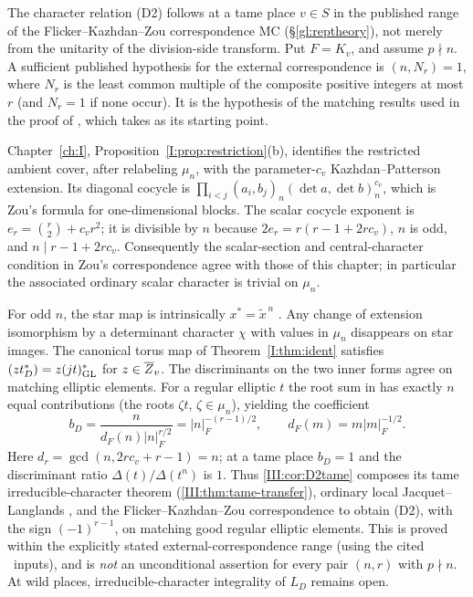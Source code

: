 \begin{remark}\label{I:rem:D2tame}
The character relation (D2) follows at a tame place $v\in S$ in the
published range of the Flicker--Kazhdan--Zou
correspondence $\mathrm{MC}$ (\S\ref{gl:reptheory}), not merely from the unitarity of the division-side
transform.  Put $F=K_v$, and assume $p\nmid n$.
A sufficient published hypothesis for the external correspondence
is $(n,N_r)=1$, where $N_r$ is the least common multiple of the
composite positive integers at most $r$ (and $N_r=1$ if none occur).
It is the hypothesis of the matching results
\cite[\S12, Corollary; \S13, Theorem]{FK86} used in the proof of
\cite[\S26, Theorem]{FK86}, which \cite[Proposition~3.6 and
Definition~3.7]{Zo23} takes as its starting point.

Chapter~\ref{ch:I}, Proposition~\ref{I:prop:restriction}(b), identifies the
restricted ambient cover, after relabeling $\mu_n$, with the
parameter-$c_v$ Kazhdan--Patterson extension.  Its diagonal cocycle
is $\prod_{i<j}(a_i,b_j)_n(\det a,\det b)_n^{c_v}$,
which is Zou's formula \cite[(2.1)]{Zo23} for one-dimensional blocks.
The scalar cocycle exponent is
$e_r=\binom r2+c_vr^2$; it is divisible by $n$ because
$2e_r=r(r-1+2rc_v)$, $n$ is odd, and
$n\mid r-1+2rc_v$.  Consequently the scalar-section and
central-character condition in Zou's correspondence agree with
those of this chapter; in particular the associated ordinary scalar
character is trivial on $\mu_n$.

For odd $n$, the star map is intrinsically
$x^*=\tilde x^{\,n}$ \cite[\S4]{FK86}.  Any change of extension
isomorphism by a determinant character $\chi$ with values in
$\mu_n$ disappears on star images.  The canonical torus map of
Theorem~\ref{I:thm:ident} satisfies
$\relax(z t_D^*)=z(jt)_{\mathrm{GL}}^*$ for $z\in\overline{Z}_v$.
The discriminants on the two inner forms agree on matching
elliptic elements.  For a regular elliptic $t$ the root sum in
\cite[(3.2)]{Zo23} has exactly $n$ equal contributions (the roots
$\zeta t$, $\zeta\in\mu_n$), yielding the coefficient
\[
 b_D=\frac{n}{d_F(n)|n|_F^{r/2}}
     =|n|_F^{-(r-1)/2},\qquad
 d_F(m)=m|m|_F^{-1/2}.
\]
Here $d_r=\gcd(n,2rc_v+r-1)=n$; at a tame place
$b_D=1$ and the discriminant ratio $\Delta(t)/\Delta(t^n)$
is $1$.  Thus \cref{III:cor:D2tame} composes
its tame irreducible-character theorem (\cref{III:thm:tame-transfer}),
ordinary local Jacquet--Langlands \cite{DKV84}, and the Flicker--Kazhdan--Zou
correspondence to obtain (D2), with the
sign $(-1)^{r-1}$, on matching good regular elliptic elements.
This is proved within the explicitly stated external-correspondence
range (using the cited \Ev\ inputs), and is \emph{not} an
unconditional assertion for every pair $(n,r)$ with $p\nmid n$.
At wild places, irreducible-character integrality of $L_D$
remains open.
\end{remark}


